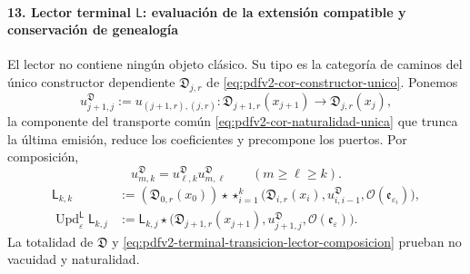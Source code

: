 \paragraph{13. Lector terminal \(\mathsf L\): evaluación de la extensión compatible y conservación de genealogía}
El lector no contiene ningún objeto clásico. Su tipo es la categoría de
caminos del único constructor dependiente
\(\mathfrak D_{j,r}\) de \eqref{eq:pdfv2-cor-constructor-unico}. Ponemos
\begin{equation}
\label{eq:pdfv2-terminal-transicion-lector-tipado}
 u^{\mathfrak D}_{j+1,j}
 :=u_{(j+1,r),(j,r)}:
 \mathfrak D_{j+1,r}(x_{j+1})
 \longrightarrow\mathfrak D_{j,r}(x_j),
\end{equation}
la componente del transporte común
\eqref{eq:pdfv2-cor-naturalidad-unica} que trunca la última emisión, reduce
los coeficientes y precompone los puertos. Por composición,
\begin{equation}
\label{eq:pdfv2-terminal-transicion-lector-composicion}
 u^{\mathfrak D}_{m,k}
 =u^{\mathfrak D}_{\ell,k}u^{\mathfrak D}_{m,\ell}
 \qquad(m\geq\ell\geq k).
\end{equation}
\begin{align}
 \mathsf L_{k,k}
 &:=(\mathfrak D_{0,r}(x_0))\star
 \mathop{\star}_{i=1}^{k}
 \bigl(\mathfrak D_{i,r}(x_i),u^{\mathfrak D}_{i,i-1},
       \mathcal O(\mathfrak e_{\varepsilon_i})\bigr),
 \label{eq:pdfv2-terminal-semilla-l}\\
 \operatorname{Upd}^{\mathsf L}_{\varepsilon}\mathsf L_{k,j}
 &:=
 \mathsf L_{k,j}\star
 \bigl(\mathfrak D_{j+1,r}(x_{j+1}),
 u^{\mathfrak D}_{j+1,j},\mathcal O(\mathfrak e_\varepsilon)\bigr).
 \label{eq:pdfv2-terminal-update-l}
\end{align}
La totalidad de \(\mathfrak D\) y
\eqref{eq:pdfv2-terminal-transicion-lector-composicion} prueban no vacuidad
y naturalidad.

